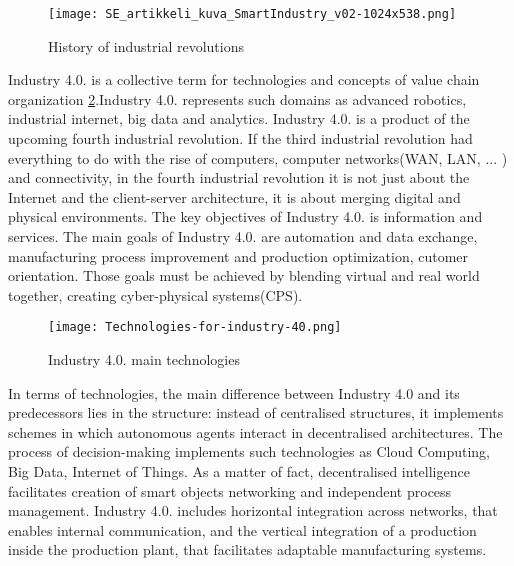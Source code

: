 \documentclass[thesis=B,english]{FITthesis}[2019/12/23]
\begin{document}
\begin{figure}
	\texttt{[image: SE\_artikkeli\_kuva\_SmartIndustry\_v02-1024x538.png]}
	\caption[History of industrial revolutions]{History of industrial revolutions}\label{fig:float38}
\end{figure} 

Industry 4.0. is a collective term for technologies and concepts of value chain organization \ref{fig:float39}.Industry 4.0. represents such domains as advanced robotics, industrial internet, big data and analytics. Industry 4.0. is a product of the upcoming fourth industrial revolution. If the third industrial revolution had everything to do with the rise of computers, computer networks(WAN, LAN, ... ) and connectivity, in the fourth industrial revolution it is not just about the Internet and the client-server architecture, it is about merging digital and physical environments. The key objectives of Industry 4.0. is information and services. The main goals of Industry 4.0. are automation and data exchange, manufacturing process improvement and production optimization, cutomer orientation. Those goals must be achieved by blending virtual and real world together, creating cyber-physical systems(CPS).


\begin{figure}[H]
	\texttt{[image: Technologies-for-industry-40.png]}
	\caption[Industry 4.0 technologies]{Industry 4.0. main technologies}\label{fig:float39}
\end{figure}%

In terms of technologies, the main difference between Industry 4.0 and its predecessors lies in the structure: instead of centralised structures, it implements schemes in which autonomous agents interact in decentralised architectures. The process of decision-making implements such technologies as Cloud Computing, Big Data, Internet of Things. As a matter of fact, decentralised intelligence facilitates creation of smart objects networking and independent process management. Industry 4.0. includes horizontal integration across networks, that enables internal communication, and the vertical integration of a production inside the production plant, that facilitates adaptable manufacturing systems.
\end{document}
